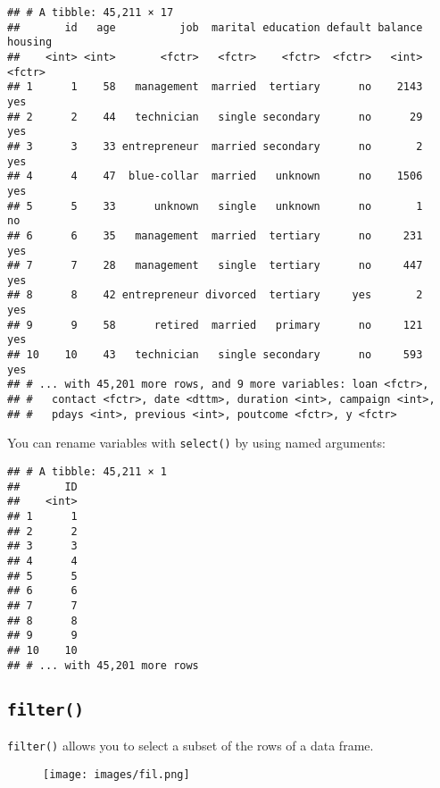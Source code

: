 \documentclass[]{book}
\newenvironment{Shaded}{\begin{snugshade}}{\end{snugshade}}
\newcommand{\KeywordTok}[1]{\textcolor[rgb]{0.13,0.29,0.53}{\textbf{{#1}}}}
\newcommand{\DataTypeTok}[1]{\textcolor[rgb]{0.13,0.29,0.53}{{#1}}}
\newcommand{\StringTok}[1]{\textcolor[rgb]{0.31,0.60,0.02}{{#1}}}
\newcommand{\CommentTok}[1]{\textcolor[rgb]{0.56,0.35,0.01}{\textit{{#1}}}}
\newcommand{\NormalTok}[1]{{#1}}
\begin{document}
\begin{verbatim}
## # A tibble: 45,211 × 17
##       id   age          job  marital education default balance housing
##    <int> <int>       <fctr>   <fctr>    <fctr>  <fctr>   <int>  <fctr>
## 1      1    58   management  married  tertiary      no    2143     yes
## 2      2    44   technician   single secondary      no      29     yes
## 3      3    33 entrepreneur  married secondary      no       2     yes
## 4      4    47  blue-collar  married   unknown      no    1506     yes
## 5      5    33      unknown   single   unknown      no       1      no
## 6      6    35   management  married  tertiary      no     231     yes
## 7      7    28   management   single  tertiary      no     447     yes
## 8      8    42 entrepreneur divorced  tertiary     yes       2     yes
## 9      9    58      retired  married   primary      no     121     yes
## 10    10    43   technician   single secondary      no     593     yes
## # ... with 45,201 more rows, and 9 more variables: loan <fctr>,
## #   contact <fctr>, date <dttm>, duration <int>, campaign <int>,
## #   pdays <int>, previous <int>, poutcome <fctr>, y <fctr>
\end{verbatim}

You can rename variables with \texttt{select()} by using named
arguments:

\begin{Shaded}
\end{Shaded}

\begin{verbatim}
## # A tibble: 45,211 × 1
##       ID
##    <int>
## 1      1
## 2      2
## 3      3
## 4      4
## 5      5
## 6      6
## 7      7
## 8      8
## 9      9
## 10    10
## # ... with 45,201 more rows
\end{verbatim}

\subsection{\texorpdfstring{\texttt{filter()}}{filter()}}\label{filter}

\texttt{filter()} allows you to select a subset of the rows of a data
frame.

\begin{figure}[htbp]
\centering
\texttt{[image: images/fil.png]}
\caption{}
\end{figure}
\end{document}
